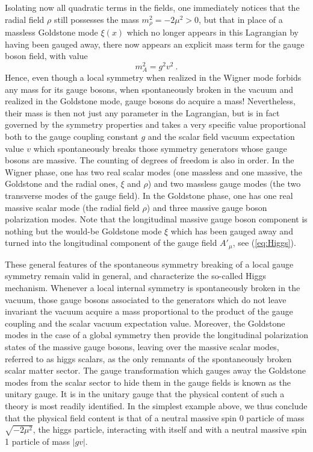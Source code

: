 \documentclass[a4paper,11pt]{article}
\begin{document}
Isolating now all quadratic terms in the fields, one immediately notices
that the radial field $\rho$ still possesses the mass $m^2_\rho=-2\mu^2>0$,
but that in place of a massless Goldstone mode $\xi(x)$ which no longer
appears in this Lagrangian by having been gauged away, there now appears
an explicit mass term for the gauge boson field, with value
\begin{equation}
m^2_A=g^2v^2\ .
\end{equation}
Hence, even though a local symmetry when realized in the Wigner mode
forbids any mass for its gauge bosons, when spontaneously broken in
the vacuum and realized in the Goldstone mode, gauge bosons do acquire a mass!
Nevertheless, their mass is then not just any parameter in the Lagrangian,
but is in fact governed by the symmetry properties and takes a very
specific value proportional both to the gauge coupling constant $g$ and the
scalar field vacuum expectation value $v$ which spontaneously breaks
those symmetry generators whose gauge bosons are massive. The counting
of degrees of freedom is also in order. In the Wigner phase, one has
two real scalar modes (one massless and one massive, the Goldstone and the 
radial ones, $\xi$ and $\rho$) and two massless gauge modes (the two 
transverse modes of the gauge field). In the Goldstone phase, one has one real 
massive scalar mode (the radial field $\rho$) and three massive gauge boson
polarization modes. Note that the longitudinal massive gauge boson component 
is nothing but the would-be Goldstone mode $\xi$ which has been gauged away and
turned into the longitudinal component of the gauge field $A'_\mu$, see
(\ref{eq:Higgs}).

These general features of the spontaneous symmetry breaking of a local gauge
symmetry remain valid in general, and characterize the so-called Higgs 
mechanism. Whenever a local internal symmetry is spontaneously broken
in the vacuum, those gauge bosons associated to the generators which do not
leave invariant the vacuum acquire a mass proportional to the product of
the gauge coupling and the scalar vacuum expectation value. Moreover,
the Goldstone modes in the case of a global symmetry then provide
the longitudinal polarization states of the massive gauge bosons, leaving 
over the massive scalar modes, referred to as higgs scalars, as the only 
remnants of the spontaneously broken scalar matter sector.
The gauge transformation which gauges away the Goldstone modes from the scalar
sector to hide them in the gauge fields is known as the unitary gauge.
It is in the unitary gauge that the physical content of such a theory
is most readily identified. In the simplest example above, we thus conclude
that the physical field content is that of a neutral massive spin 0 particle 
of mass $\sqrt{-2\mu^2}$, the higgs particle, interacting with itself
and with a neutral massive spin 1 particle of mass $|gv|$.
\end{document}
